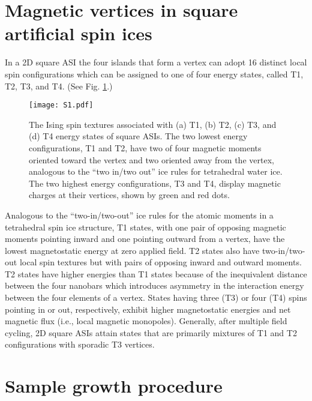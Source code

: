 \documentclass[aps, prb, reprint, showpacs, superscriptaddress]{revtex4-1}
\begin{document}
\appendix
\renewcommand{\thesection}{\Alph{section}}

\section{Magnetic vertices in square artificial spin ices}
\renewcommand{\thefigure}{\thesection} 

In a 2D square ASI the four islands that form a vertex can adopt 16 distinct local spin configurations which can be assigned to one of four energy states, called T1, T2, T3, and T4.
(See Fig. \ref{vertices}.) 
\begin{figure}[b]
\begin{center}
\texttt{[image: S1.pdf]}
\caption {
The Ising spin textures associated with (a) T1, (b) T2, (c) T3, and (d) T4 energy states of square ASIs. 
The two lowest energy configurations, T1 and T2, have two of four magnetic moments oriented toward the vertex and two oriented away from the vertex, analogous to the ``two in/two out'' ice rules for tetrahedral water ice. 
The two highest energy configurations, T3 and T4, display magnetic charges at their vertices, shown by green and red dots. 
}
\end{center}
\label{vertices}
\end{figure}
Analogous to the ``two-in/two-out'' ice rules for the atomic moments in a tetrahedral spin ice structure, T1 states, with one pair of opposing magnetic moments pointing inward and one pointing outward  from a vertex, have the lowest magnetostatic energy at zero applied field.
T2 states also have  two-in/two-out local spin textures but with pairs of opposing inward and outward moments. 
T2 states have higher energies than T1 states because of the inequivalent distance between the four nanobars which introduces asymmetry in the interaction energy between the four elements of a vertex.
States having three (T3) or four (T4) spins pointing in or out, respectively, exhibit higher magnetostatic energies and net magnetic flux (i.e., local magnetic monopoles).  
Generally, after multiple field cycling, 2D square ASIs attain states that are primarily mixtures of T1 and T2 configurations with sporadic T3 vertices.\cite{Farhan}

\section{Sample growth procedure}
\label{growth}
\end{document}
